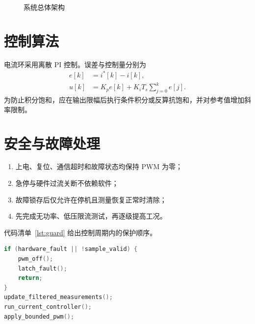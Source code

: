 \documentclass[12pt,fontset=fandol]{ctexart}
\begin{document}
\begin{figure}[htbp]
  \centering
  \caption{系统总体架构}\label{fig:architecture}
\end{figure}

\section{控制算法}
电流环采用离散 PI 控制。误差与控制量分别为
\begin{align}
  e[k] &= i^{*}[k]-i[k],\\
  u[k] &= K_{p} e[k] + K_{i} T_{s}\sum_{j=0}^{k} e[j].
\end{align}
为防止积分饱和，应在输出限幅后执行条件积分或反算抗饱和，并对参考值增加斜率限制。

\section{安全与故障处理}
\begin{enumerate}
  \item 上电、复位、通信超时和故障状态均保持 PWM 为零；
  \item 急停与硬件过流关断不依赖软件；
  \item 故障锁存后仅允许在停机且测量恢复正常时清除；
  \item 先完成无功率、低压限流测试，再逐级提高工况。
\end{enumerate}

代码清单~\ref{lst:guard} 给出控制周期内的保护顺序。

\begin{lstlisting}[language=C,caption={故障优先的控制周期},label={lst:guard}]
if (hardware_fault || !sample_valid) {
    pwm_off();
    latch_fault();
    return;
}
update_filtered_measurements();
run_current_controller();
apply_bounded_pwm();
\end{lstlisting}
\end{document}
